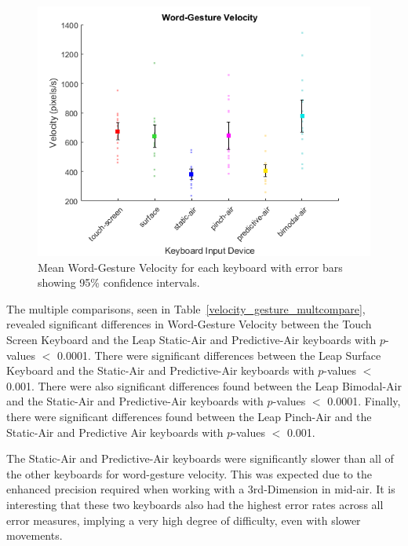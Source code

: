 \begin{figure}[h]
	\centering
	\includegraphics{fig_velocity_gesture_mean}
	\caption[Mean Word-Gesture Velocity]{Mean Word-Gesture Velocity for each keyboard with error bars showing 95\% confidence intervals.}
	\label{fig_velocity_gesture_mean}
\end{figure}

The multiple comparisons, seen in Table~\ref{velocity_gesture_multcompare}, revealed significant differences in Word-Gesture Velocity between the Touch Screen Keyboard and the Leap Static-Air and Predictive-Air keyboards with $p$-values $<$ 0.0001. There were significant differences between the Leap Surface Keyboard and the Static-Air and Predictive-Air keyboards with $p$-values $<$ 0.001. There were also significant differences found between the Leap Bimodal-Air and the Static-Air and Predictive-Air keyboards with $p$-values $<$ 0.0001. Finally, there were significant differences found between the Leap Pinch-Air and the Static-Air and Predictive Air keyboards with $p$-values $<$ 0.001.

The Static-Air and Predictive-Air keyboards were significantly slower than all of the other keyboards for word-gesture velocity. This was expected due to the enhanced precision required when working with a 3rd-Dimension in mid-air. It is interesting that these two keyboards also had the highest error rates across all error measures, implying a very high degree of difficulty, even with slower movements.

